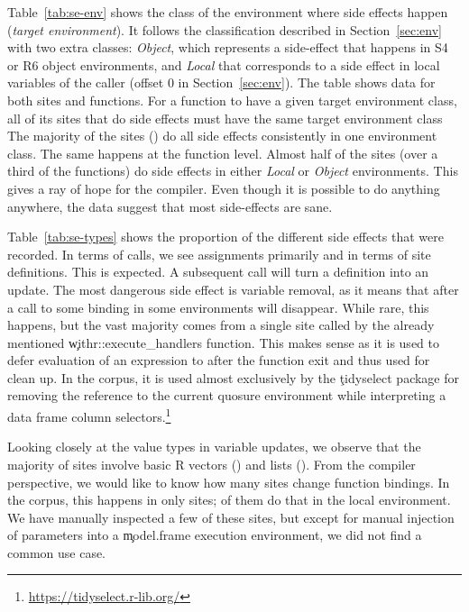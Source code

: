 \documentclass[review,screen,acmsmall,anonymous=true]{acmart}
\begin{document}
Table~\ref{tab:se-env} shows the class of the environment where \eval side
effects happen (\emph{target environment}). It follows the classification
described in Section~\ref{sec:env} with two extra classes: \emph{Object}, which
represents a side-effect that happens in S4 or R6 object environments, and
\emph{Local} that corresponds to a side effect in local variables of the \eval
caller (offset 0 in Section~\ref{sec:env}). The table shows data for both \eval
sites and functions. For a function to have a given target environment class,
all of its \eval sites that do side effects must have the same target
environment class The majority of the \eval sites (\SESitesInOneClass) do all
side effects consistently in one environment class. The same happens at the
function level. Almost half of the sites (over a third of the functions) do side
effects in either \emph{Local} or \emph{Object} environments. This gives a ray
of hope for the compiler. Even though it is possible to do anything anywhere,
the data suggest that most side-effects are sane.


Table~\ref{tab:se-types} shows the proportion of the different side effects
that were recorded. In terms of calls, we see assignments primarily and in
terms of site definitions. This is expected. A subsequent \eval call will turn
a definition into an update. The most dangerous side effect is variable removal,
as it means that after a call to \eval some binding in some environments will
disappear. While rare, this happens, but the vast majority comes from a single
site called by the already mentioned \c{withr::execute\_handlers} function.
This makes sense as it is used to defer evaluation of an expression to after
the function exit and thus used for clean up. In the corpus, it is used almost
exclusively by the \c{tidyselect} package for removing the reference to the
current quosure environment while interpreting a data frame column
selectors.\footnote{\cf \url{https://tidyselect.r-lib.org/}}

Looking closely at the value types in variable updates, we observe that the
majority of \eval sites involve basic R vectors (\SEBasicTypeRatio) and lists
(\SEListTypeRatio). From the compiler perspective, we would like to know how
many sites change function bindings. In the corpus, this happens in only
\SEClosureType sites; \SEClosureTypeLocal of them do that in the local
environment. We have manually inspected a few of these sites, but except for
manual injection of parameters into a \c{model.frame} execution environment, we
did not find a common use case.
\end{document}
